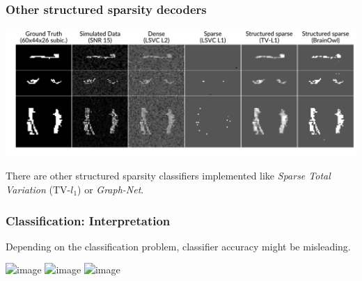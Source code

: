 \documentclass[11pt]{beamer}
\begin{document}
\appendix
\begin{frame}[t]
    \frametitle{Other structured sparsity decoders}
    
    \begin{center}
        \includegraphics[scale=0.35]{figures/template_and_weights_4_clfs.png}
    \end{center}

    There are other structured sparsity classifiers implemented like
    \emph{Sparse Total Variation} (TV-$l_1$) or
    \emph{Graph-Net}.


\end{frame}
\begin{frame}
  \frametitle{Classification: Interpretation}
  Depending on the classification problem, classifier accuracy might be
  misleading. 
  \begin{center}
    \includegraphics<1>[scale=0.22]{figures/moons_circles_linear_clf_1.png}
    \includegraphics<2>[scale=0.22]{figures/moons_circles_linear_clf_2.png}
    \includegraphics<3>[scale=0.22]{figures/moons_circles_linear_clf.png}
  \end{center}
\end{frame}
\end{document}
